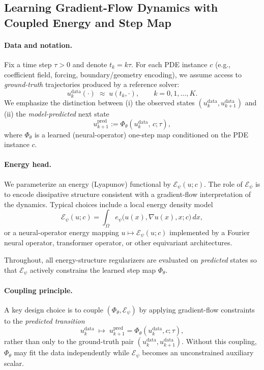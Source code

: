 \documentclass[11pt]{article}
\begin{document}
\subsection{Learning Gradient-Flow Dynamics with Coupled Energy and Step Map}
\label{sec:learning_gf_coupled}

\paragraph{Data and notation.}
Fix a time step $\tau>0$ and denote $t_k = k\tau$.
For each PDE instance $c$ (e.g., coefficient field, forcing, boundary/geometry encoding), we assume access to \emph{ground-truth} trajectories produced by a reference solver:
\[
u_k^{\mathrm{data}}(\cdot)\;\approx\; u(t_k,\cdot),\qquad k=0,1,\dots,K.
\]
We emphasize the distinction between (i) the observed states $(u_k^{\mathrm{data}},u_{k+1}^{\mathrm{data}})$ and (ii) the \emph{model-predicted} next state
\begin{equation}
\label{eq:pred-step}
u_{k+1}^{\mathrm{pred}}
:=
\Phi_\theta\!\left(u_k^{\mathrm{data}},\,c;\tau\right),
\end{equation}
where $\Phi_\theta$ is a learned (neural-operator) one-step map conditioned on the PDE instance $c$.

\paragraph{Energy head.}
We parameterize an energy (Lyapunov) functional by $\mathcal E_\psi(u;c)$.
The role of $\mathcal E_\psi$ is to encode dissipative structure consistent with a gradient-flow interpretation of the dynamics. Typical choices include a local energy density model
\begin{equation}
\label{eq:local-energy}
\mathcal E_\psi(u;c)
=\int_\Omega e_\psi\big(u(x),\nabla u(x),x;c\big)\,dx,
\end{equation}
or a neural-operator energy mapping $u\mapsto \mathcal E_\psi(u;c)$ implemented by a Fourier neural operator, transformer operator, or other equivariant architectures.

Throughout, all energy-structure regularizers are evaluated on \emph{predicted} states so that $\mathcal E_\psi$ actively constrains the learned step map $\Phi_\theta$.

\paragraph{Coupling principle.}
A key design choice is to couple $(\Phi_\theta,\mathcal E_\psi)$ by applying gradient-flow constraints to the \emph{predicted transition}
\[
u_k^{\mathrm{data}} \;\mapsto\; u_{k+1}^{\mathrm{pred}}=\Phi_\theta(u_k^{\mathrm{data}},c;\tau),
\]
rather than only to the ground-truth pair $(u_k^{\mathrm{data}},u_{k+1}^{\mathrm{data}})$.
Without this coupling, $\Phi_\theta$ may fit the data independently while $\mathcal E_\psi$ becomes an unconstrained auxiliary scalar.
\end{document}
